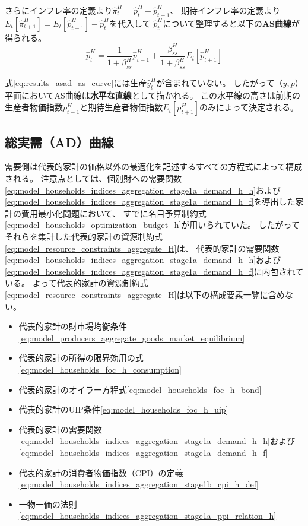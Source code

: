 さらにインフレ率の定義より\(\hat{\pi}_t^H=\hat{p}_t^H-\hat{p}_{t-1}^H\)、
期待インフレ率の定義より\(E_t[\hat{\pi}_{t+1}^H]=E_t[\hat{p}_{t+1}^H]-\hat{p}_t^H\)を代入して
 \(\hat{p}_t^H\)について整理すると以下の\textbf{AS曲線}が得られる。
\begin{equation}
\hat{p}_t^H=\frac{1}{1+\beta_{ss}^H}\hat{p}_{t-1}^H+\frac{\beta_{ss}^H}{1+\beta_{ss}^H}E_t[\hat{p}_{t+1}^H]
\label{eq:results_asad_as_curve}
\end{equation}

式\eqref{eq:results_asad_as_curve}には生産\(\hat{y}_t^H\)が含まれていない。
したがって（\(y,p\)）平面においてAS曲線は\textbf{水平な直線}として描かれる。
この水平線の高さは前期の生産者物価指数\(p_{t-1}^H\)と期待生産者物価指数\(E_t[p_{t+1}^H]\)のみによって決定される。

\subsection{総実需（AD）曲線}
\label{sec:results_asad_ad}
需要側は代表的家計の価格以外の最適化を記述するすべての方程式によって構成される。
注意点としては、個別財への需要関数\eqref{eq:model_households_indices_aggregation_stage1a_demand_h_h}および\eqref{eq:model_households_indices_aggregation_stage1a_demand_h_f}を導出した家計の費用最小化問題において、
すでに名目予算制約式\eqref{eq:model_households_optimization_budget_h}が用いられていた。
したがってそれらを集計した代表的家計の資源制約式\eqref{eq:model_resource_constraints_aggregate_H}は、
代表的家計の需要関数\eqref{eq:model_households_indices_aggregation_stage1a_demand_h_h}および\eqref{eq:model_households_indices_aggregation_stage1a_demand_h_f}に内包されている。
よって代表的家計の資源制約式\eqref{eq:model_resource_constraints_aggregate_H}は以下の構成要素一覧に含めない。

\begin{itemize}
    \item 代表的家計の財市場均衡条件\eqref{eq:model_producers_aggregate_goods_market_equilibrium}
    \item 代表的家計の所得の限界効用の式\eqref{eq:model_households_foc_h_consumption}
    \item 代表的家計のオイラー方程式\eqref{eq:model_households_foc_h_bond}
    \item 代表的家計のUIP条件\eqref{eq:model_households_foc_h_uip}
    \item 代表的家計の需要関数\eqref{eq:model_households_indices_aggregation_stage1a_demand_h_h}および\eqref{eq:model_households_indices_aggregation_stage1a_demand_h_f}
    \item 代表的家計の消費者物価指数（CPI）の定義\eqref{eq:model_households_indices_aggregation_stage1b_cpi_h_def}
    \item 一物一価の法則\eqref{eq:model_households_indices_aggregation_stage1a_ppi_relation_h}
\end{itemize}

